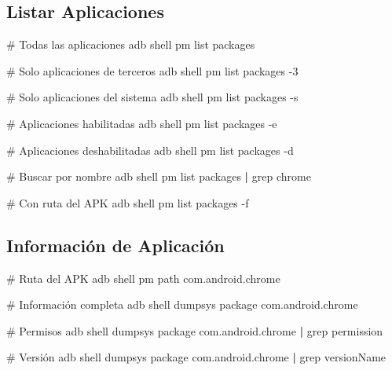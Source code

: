 \documentclass[
  doc,
  floatsintext,
  longtable,
  a4paper,
  nolmodern,
  notxfonts,
  notimes,
  12pt,
  colorlinks=true,linkcolor=blue,citecolor=blue,urlcolor=blue]{apa7}
\newenvironment{Shaded}{\begin{snugshade}}{\end{snugshade}}
\newcommand{\AttributeTok}[1]{\textcolor[rgb]{0.40,0.45,0.13}{#1}}
\newcommand{\CommentTok}[1]{\textcolor[rgb]{0.37,0.37,0.37}{#1}}
\newcommand{\ExtensionTok}[1]{\textcolor[rgb]{0.00,0.23,0.31}{#1}}
\newcommand{\FunctionTok}[1]{\textcolor[rgb]{0.28,0.35,0.67}{#1}}
\newcommand{\KeywordTok}[1]{\textcolor[rgb]{0.00,0.23,0.31}{\textbf{#1}}}
\newcommand{\NormalTok}[1]{\textcolor[rgb]{0.00,0.23,0.31}{#1}}
\begin{document}
\subsection{Listar Aplicaciones}\label{listar-aplicaciones}

\begin{Shaded}
\begin{Highlighting}[]
\CommentTok{\# Todas las aplicaciones}
\ExtensionTok{adb}\NormalTok{ shell pm list packages}

\CommentTok{\# Solo aplicaciones de terceros}
\ExtensionTok{adb}\NormalTok{ shell pm list packages }\AttributeTok{{-}3}

\CommentTok{\# Solo aplicaciones del sistema}
\ExtensionTok{adb}\NormalTok{ shell pm list packages }\AttributeTok{{-}s}

\CommentTok{\# Aplicaciones habilitadas}
\ExtensionTok{adb}\NormalTok{ shell pm list packages }\AttributeTok{{-}e}

\CommentTok{\# Aplicaciones deshabilitadas}
\ExtensionTok{adb}\NormalTok{ shell pm list packages }\AttributeTok{{-}d}

\CommentTok{\# Buscar por nombre}
\ExtensionTok{adb}\NormalTok{ shell pm list packages }\KeywordTok{|} \FunctionTok{grep}\NormalTok{ chrome}

\CommentTok{\# Con ruta del APK}
\ExtensionTok{adb}\NormalTok{ shell pm list packages }\AttributeTok{{-}f}
\end{Highlighting}
\end{Shaded}

\subsection{Información de
Aplicación}\label{informaciuxf3n-de-aplicaciuxf3n}

\begin{Shaded}
\begin{Highlighting}[]
\CommentTok{\# Ruta del APK}
\ExtensionTok{adb}\NormalTok{ shell pm path com.android.chrome}

\CommentTok{\# Información completa}
\ExtensionTok{adb}\NormalTok{ shell dumpsys package com.android.chrome}

\CommentTok{\# Permisos}
\ExtensionTok{adb}\NormalTok{ shell dumpsys package com.android.chrome }\KeywordTok{|} \FunctionTok{grep}\NormalTok{ permission}

\CommentTok{\# Versión}
\ExtensionTok{adb}\NormalTok{ shell dumpsys package com.android.chrome }\KeywordTok{|} \FunctionTok{grep}\NormalTok{ versionName}
\end{Highlighting}
\end{Shaded}
\end{document}
